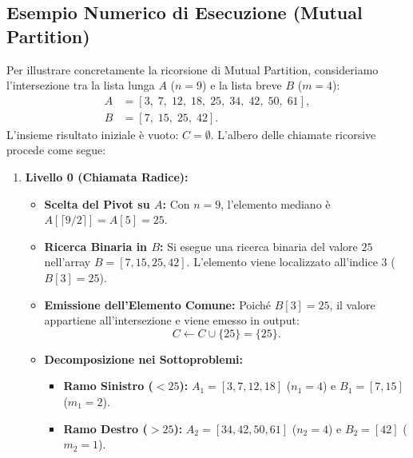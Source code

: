 \FloatBarrier
\subsection{Esempio Numerico di Esecuzione (Mutual Partition)}
\label{sec:mutual-partition-example}
Per illustrare concretamente la ricorsione di Mutual Partition, consideriamo l'intersezione tra la lista lunga $A$ ($n = 9$) e la lista breve $B$ ($m = 4$):
\begin{align}
  A &= [3, \; 7, \; 12, \; 18, \; 25, \; 34, \; 42, \; 50, \; 61], \\
  B &= [7, \; 15, \; 25, \; 42].
\end{align}
L'insieme risultato iniziale \`e vuoto: $C = \emptyset$. L'albero delle chiamate ricorsive procede come segue:

\begin{enumerate}
  \item \textbf{Livello 0 (Chiamata Radice):}
  \begin{itemize}
    \item \textbf{Scelta del Pivot su $A$:} Con $n = 9$, l'elemento mediano \`e $A[\lceil 9/2 \rceil] = A[5] = 25$.
    \item \textbf{Ricerca Binaria in $B$:} Si esegue una ricerca binaria del valore $25$ nell'array $B = [7, 15, 25, 42]$. L'elemento viene localizzato all'indice $3$ ($B[3] = 25$).
    \item \textbf{Emissione dell'Elemento Comune:} Poich\'e $B[3] = 25$, il valore appartiene all'intersezione e viene emesso in output:
    \begin{equation}
      C \leftarrow C \cup \{25\} = \{25\}.
    \end{equation}
    \item \textbf{Decomposizione nei Sottoproblemi:}
    \begin{itemize}
      \item \textbf{Ramo Sinistro ($< 25$):} $A_1 = [3, 7, 12, 18]$ ($n_1 = 4$) e $B_1 = [7, 15]$ ($m_1 = 2$).
      \item \textbf{Ramo Destro ($> 25$):} $A_2 = [34, 42, 50, 61]$ ($n_2 = 4$) e $B_2 = [42]$ ($m_2 = 1$).
    \end{itemize}
  \end{itemize}


\end{enumerate}
